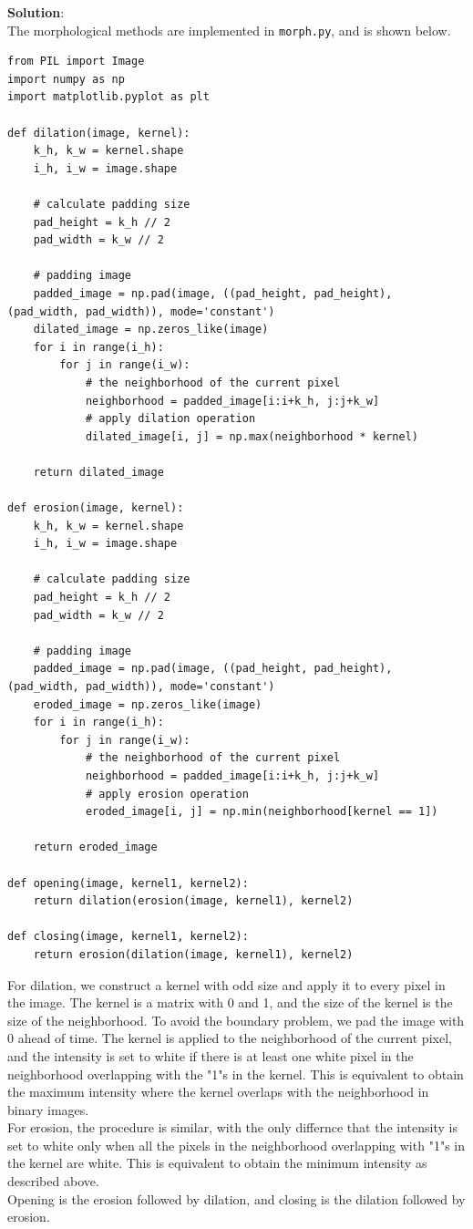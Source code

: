 \documentclass[UTF8]{ctexart}
\begin{document}
\textbf{Solution}:\\
The morphological methods are implemented in \texttt{morph.py}, and is shown below.\\
\begin{lstlisting}
from PIL import Image
import numpy as np
import matplotlib.pyplot as plt

def dilation(image, kernel):
    k_h, k_w = kernel.shape
    i_h, i_w = image.shape

    # calculate padding size
    pad_height = k_h // 2
    pad_width = k_w // 2

    # padding image
    padded_image = np.pad(image, ((pad_height, pad_height), (pad_width, pad_width)), mode='constant')
    dilated_image = np.zeros_like(image)
    for i in range(i_h):
        for j in range(i_w):
            # the neighborhood of the current pixel
            neighborhood = padded_image[i:i+k_h, j:j+k_w]
            # apply dilation operation
            dilated_image[i, j] = np.max(neighborhood * kernel)

    return dilated_image

def erosion(image, kernel):
    k_h, k_w = kernel.shape
    i_h, i_w = image.shape

    # calculate padding size
    pad_height = k_h // 2
    pad_width = k_w // 2

    # padding image
    padded_image = np.pad(image, ((pad_height, pad_height), (pad_width, pad_width)), mode='constant')
    eroded_image = np.zeros_like(image)
    for i in range(i_h):
        for j in range(i_w):
            # the neighborhood of the current pixel
            neighborhood = padded_image[i:i+k_h, j:j+k_w]
            # apply erosion operation
            eroded_image[i, j] = np.min(neighborhood[kernel == 1])

    return eroded_image

def opening(image, kernel1, kernel2):
    return dilation(erosion(image, kernel1), kernel2)

def closing(image, kernel1, kernel2):
    return erosion(dilation(image, kernel1), kernel2)
\end{lstlisting}
\newpage
For dilation, we construct a kernel with odd size and apply it to every pixel in the image.
The kernel is a matrix with 0 and 1, and the size of the kernel is the size of the neighborhood.
To avoid the boundary problem, we pad the image with 0 ahead of time.
The kernel is applied to the neighborhood of the current pixel, and the intensity is set to white 
if there is at least one white pixel in the neighborhood overlapping with the "1"s in the kernel.
This is equivalent to obtain the maximum intensity where the kernel overlaps with the neighborhood in binary images.\\
For erosion, the procedure is similar, with the only differnce that the intensity is set to white only when
all the pixels in the neighborhood overlapping with "1"s in the kernel are white. 
This is equivalent to obtain the minimum intensity as described above.\\
Opening is the erosion followed by dilation, and closing is the dilation followed by erosion.\\
\end{document}
